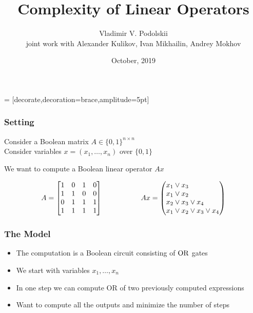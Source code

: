 \documentclass{beamer}
\author{Vladimir V. Podolskii\inst{1}\\[3mm] \small joint work with Alexander Kulikov, Ivan Mikhailin, Andrey Mokhov}
\institute{
 \inst{1} \  Steklov\ Mathematical\ Institute, Moscow\\
 Higher School of Economics, Moscow\\
}
\date{October, 2019}
\title{Complexity of Linear Operators}
\begin{document}
 = [decorate,decoration={brace,amplitude=5pt}]


\begin{frame}

\titlepage

\end{frame}



\begin{frame}
\frametitle{Setting}

Consider a Boolean matrix $A \in \{0,1\}^{n\times n}$\\
Consider variables $x = (x_1,\ldots, x_n)$ over $\{0,1\}$

\medskip
We want to compute a Boolean linear operator $A x$

\medskip

\[
  A =\begin{bmatrix}
    1 & 0 & 1 & 0 \\
    1 & 1 & 0 & 0 \\
    0 & 1 & 1 & 1 \\
    1 & 1 & 1 & 1 \\
  \end{bmatrix}
 \ \ \ \ \ \ \ \ \ \ \ \ \ \ \ \ Ax = \left(\begin{array}{@{}l@{}}
    x_1 \vee x_3 \\
    x_1 \vee x_2 \\
    x_2 \vee x_3 \vee x_4 \\
    x_1 \vee x_2 \vee x_3 \vee x_4\\
  \end{array}\right)
  \]



\end{frame}



\begin{frame}
\frametitle{The Model}

\begin{itemize}
\item The computation is a Boolean circuit consisting of ${\rm OR}$ gates
\item We start with variables $x_1,\ldots, x_n$
\item In one step we can compute OR of two previously computed expressions
\item Want to compute all the outputs and minimize the number of steps
\end{itemize}

\end{frame}
\end{document}
